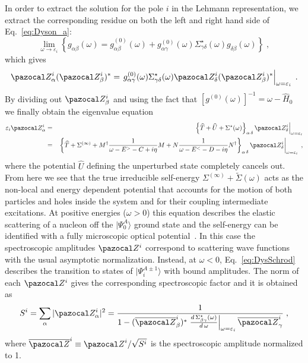 In order to extract the solution for the pole $i$ in the Lehmann representation, we extract the corresponding residue on both the left and right hand side of Eq.~\eqref{eq:Dyson_a}:
 \begin{equation}
   \lim _{\omega \rightarrow \varepsilon_i}
   \left\{
     g_{\alpha\beta}(\omega) = g^{(0)}_{\alpha\beta}(\omega) + g^{(0)}_{\alpha\gamma}(\omega)  \Sigma^\star_{\gamma\delta}(\omega) g_{\delta\beta}(\omega)
   \right\} \; ,
 \end{equation}
which gives
 \begin{equation}
    \pazocal Z^i_\alpha (\pazocal Z^i_\beta)^*  =  \left. g^{(0)}_{\alpha\gamma}(\omega)  \Sigma^\star_{\gamma\delta}(\omega) \pazocal Z^i_\delta (\pazocal Z^i_\beta)^*
    \right|_{\omega = \varepsilon_i}
 \; .
 \end{equation}
By dividing out $\pazocal Z^i_\beta$ and using the fact that $[g^{(0)}(\omega)]^{-1} = \omega - \widehat{H}_0$ %
we finally obtain the  eigenvalue equation
 \begin{eqnarray}
   \varepsilon_i   \pazocal Z^i_\alpha &=&   \left. \left\{ \widehat{T} + \widehat{U} +   \Sigma^\star(\omega)   \right\}_{\alpha \, \delta}
  \pazocal Z^i_\delta  \right|_{\omega = \varepsilon_i}
  \nonumber \\
  &=&  \left. \left\{  \widehat{T}  +  \Sigma^{(\infty)} +M^\dagger\frac1{\omega - E^> -C + i \eta}M +N\frac1{\omega - E^< -D - i \eta}N^\dagger     \right\}_{\alpha \, \delta}
  \pazocal Z^i_\delta  \right|_{\omega = \varepsilon_i}  \; ,
\label{eq:DysSchrod}
 \end{eqnarray}
where the potential $\widehat{U}$ defining the unperturbed state completely cancels out. From here we see that the true irreducible self-energy $\Sigma^{(\infty)}+\widetilde\Sigma(\omega)$
acts as the non-local and energy dependent potential that accounts for the motion of both particles and holes inside the system and for their
coupling intermediate excitations.
At positive energies ($\omega > 0$) this equation describes the elastic scattering of a nucleon off the $|\Psi^A_0\rangle$ ground
state and the self-energy can be identified with a fully microscopic optical potential~\cite{ch11_Capuzzi1996,ch11_Cederbaum2001,ch11_Barbieri2005}.
In this case the spectroscopic amplitudes $\pazocal Z^i$ correspond to scattering wave functions with the usual asymptotic
normalization.
Instead, at $\omega < 0$, Eq.~\eqref{eq:DysSchrod}  describes the transition to states of $|\Psi^{A\pm1}_i\rangle$ with bound amplitudes.
The norm of each $\pazocal Z^i$ gives the corresponding spectroscopic factor and it is obtained as
\begin{equation}
 S^i = \sum_\alpha |\pazocal Z^i_\alpha|^2 =  \frac 1 {1 - (\overline{\pazocal Z}^i_\beta)^*
   \left. \frac{d \, \Sigma^\star_{\beta \gamma}(\omega)}{d \, \omega} \right|_{\omega = \varepsilon_i}
    \overline{\pazocal Z}^i_\gamma}   \; ,
\label{eq:SFnorm1}
\end{equation}
where $\overline{\pazocal Z}^i \equiv {\pazocal Z}^i / \sqrt{S^i}$ is the spectroscopic amplitude normalized to 1.

